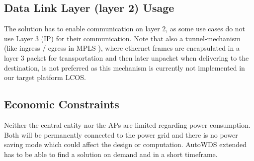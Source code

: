     \subsection{Data Link Layer (layer 2) Usage}
      The solution has to enable communication on layer 2, as some use cases do not use Layer 3 (\ac{IP}) for their communication.
      Note that also a tunnel-mechanism (like ingress / egress in \ac{MPLS} \cite{mpls}), 
      where ethernet frames are encapsulated in a layer 3 packet for transportation and then later unpacket when delivering to the destination,
      is not preferred as this mechanism is currently not implemented in our target platform \ac{LCOS}.
    
    \subsection{Economic Constraints}
      Neither the central entity nor the APs are limited regarding power consumption. 
      Both will be permanently connected to the power grid and there is no power saving mode which could affect the design or computation.
      AutoWDS extended has to be able to find a solution on demand and in a short timeframe.
  
